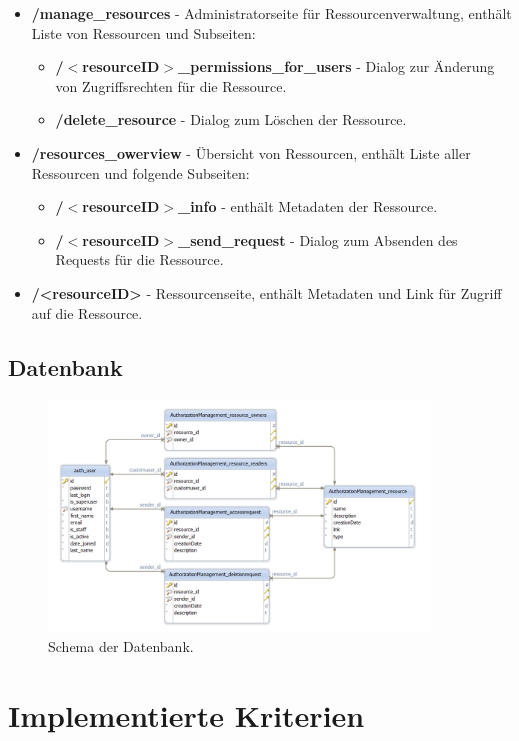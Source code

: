 \documentclass[parskip=full,11pt]{scrartcl}
\begin{document}
\begin{itemize}[itemsep=0pt]
\item \textbf{/manage{\_}resources} - Administratorseite für Ressourcenverwaltung, enthält Liste von Ressourcen und Subseiten:
\begin{itemize}[itemsep=0pt]
\item \textbf{/$<$resourceID$>${\_}permissions{\_}for{\_}users} - Dialog zur Änderung von Zugriffsrechten für die Ressource. 
\item \textbf{/delete{\_}resource} - Dialog zum Löschen der Ressource.
\end{itemize}
\item \textbf{/resources{\_}owerview} - Übersicht von Ressourcen, enthält Liste aller Ressourcen und folgende Subseiten:
\begin{itemize}[itemsep=0pt]
\item \textbf{/$<$resourceID$>${\_}info} - enthält Metadaten der Ressource.
\item \textbf{/$<$resourceID$>${\_}send{\_}request} - Dialog zum Absenden des Requests für die Ressource.
\end{itemize}
\item \textbf{/<resourceID>} - Ressourcenseite, enthält Metadaten und Link für Zugriff auf die Ressource.
\end{itemize} 
\newpage 
\subsection{Datenbank}
 \begin{figure}[ht!]
 	\centering
 	\includegraphics[width=0.9\textwidth]{res/database.png}
 	\caption{Schema der Datenbank.}
 \end{figure}

\newpage
\section{Implementierte Kriterien}
\end{document}
